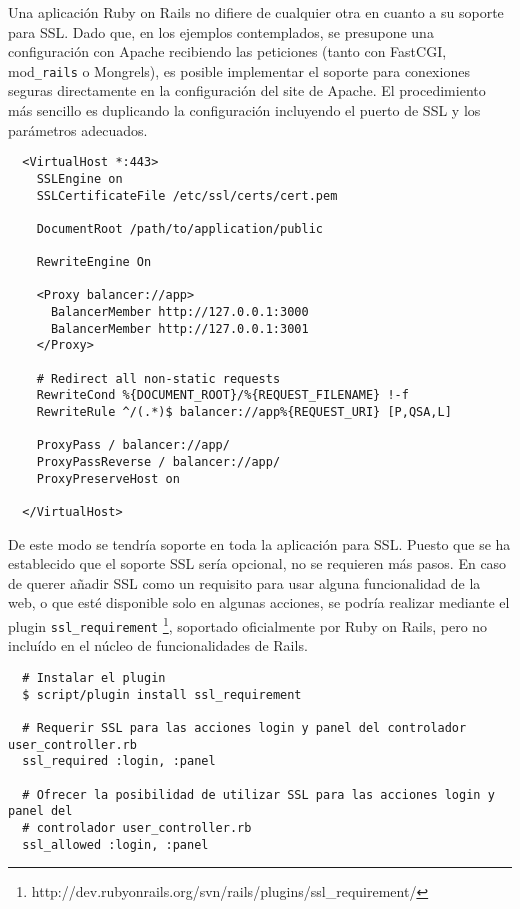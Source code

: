 Una aplicación Ruby on Rails no difiere de cualquier otra en cuanto a su soporte para SSL. Dado que, en los ejemplos contemplados, se presupone una configuración con Apache recibiendo las peticiones (tanto con FastCGI, mod\texttt{\_rails} o Mongrels), es posible implementar el soporte para conexiones seguras directamente en la configuración del site de Apache. El procedimiento más sencillo es duplicando la configuración incluyendo el puerto de SSL y los parámetros adecuados.

\begin{verbatim}
  <VirtualHost *:443>
    SSLEngine on
    SSLCertificateFile /etc/ssl/certs/cert.pem

    DocumentRoot /path/to/application/public

    RewriteEngine On

    <Proxy balancer://app>
      BalancerMember http://127.0.0.1:3000
      BalancerMember http://127.0.0.1:3001
    </Proxy>
    
    # Redirect all non-static requests
    RewriteCond %{DOCUMENT_ROOT}/%{REQUEST_FILENAME} !-f
    RewriteRule ^/(.*)$ balancer://app%{REQUEST_URI} [P,QSA,L]

    ProxyPass / balancer://app/
    ProxyPassReverse / balancer://app/
    ProxyPreserveHost on

  </VirtualHost>
\end{verbatim}

De este modo se tendría soporte en toda la aplicación para SSL. Puesto que se ha establecido que el soporte SSL sería opcional, no se requieren más pasos. En caso de querer añadir SSL como un requisito para usar alguna funcionalidad de la web, o que esté disponible solo en algunas acciones, se podría realizar mediante el plugin \texttt{ssl\_requirement} \footnote{http://dev.rubyonrails.org/svn/rails/plugins/ssl\_requirement/}, soportado oficialmente por Ruby on Rails, pero no incluído en el núcleo de funcionalidades de Rails.

\begin{verbatim}
  # Instalar el plugin
  $ script/plugin install ssl_requirement
  
  # Requerir SSL para las acciones login y panel del controlador user_controller.rb
  ssl_required :login, :panel
  
  # Ofrecer la posibilidad de utilizar SSL para las acciones login y panel del
  # controlador user_controller.rb
  ssl_allowed :login, :panel
\end{verbatim}











